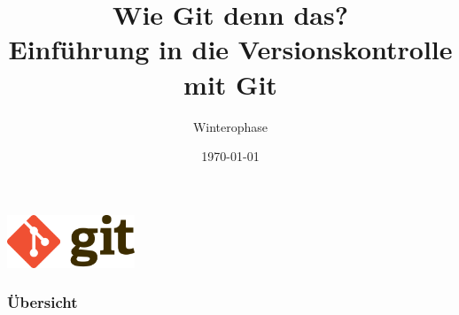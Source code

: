 \documentclass[
	ngerman, %
	aspectratio=169, %
	color={accentcolor=8b},
	colorframetitle=true,%
	authorontitle=true
]{tudabeamer}
\begin{document}
\title[Git-Workshop]{Wie Git denn das?\\Einführung in die Versionskontrolle mit Git}
\subtitle{Winterophase \the\year}

\author[]{}


\date{\today}
 
\begin{titlepage}
	
	\begin{center}
  	\includegraphics[height=60px]{git_logo}
  	\vspace{1.5cm}
	\end{center} 
\end{titlepage}

\begin{frame}
\frametitle{Übersicht}
\tableofcontents
\end{frame}
\end{document}

